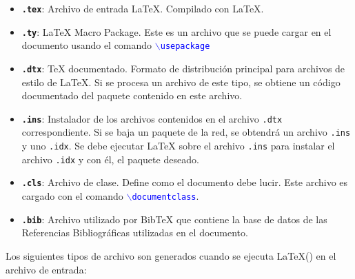 \begin{itemize}
\item \texttt{\textbf{.tex}}: Archivo de entrada \LaTeX{}. Compilado con \LaTeX{}.
\item \texttt{\textbf{.ty}}: \LaTeX{} Macro Package. Este es un archivo que se puede cargar en el documento usando el comando \textcolor{blue}{$\backslash$\texttt{usepackage}}
\item \texttt{\textbf{.dtx}}: \TeX{} documentado. Formato de distribuci\'{o}n principal para archivos de estilo de \LaTeX{}. Si se procesa un archivo de este tipo, se obtiene un c\'{o}digo documentado del paquete contenido en este archivo.
\item  \texttt{\textbf{.ins}}: Instalador de los archivos contenidos en el archivo \texttt{.dtx} correspondiente. Si se baja un paquete de la red, se obtendr\'{a} un archivo \texttt{.ins} y uno \texttt{.idx}. Se debe ejecutar \LaTeX{} sobre el archivo \texttt{.ins} para instalar el archivo \texttt{.idx} y con él, el paquete deseado.
\item  \texttt{\textbf{.cls}}: Archivo de clase. Define como el documento debe lucir. Este archivo es cargado con el comando \textcolor{blue}{$\backslash$\texttt{documentclass}}.
\item \texttt{\textbf{.bib}}: Archivo utilizado por BibTeX que contiene la base de datos de las Referencias Bibliográficas utilizadas en el documento.
 \end{itemize}

Los siguientes tipos de archivo son generados cuando se ejecuta \LaTeX() en el archivo de entrada:

